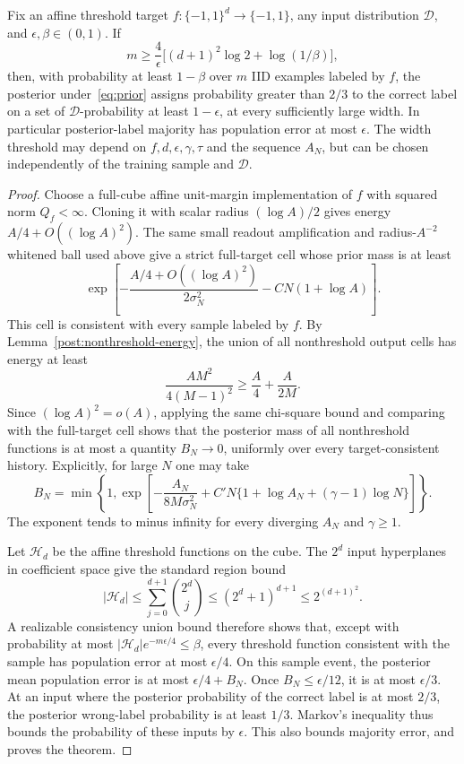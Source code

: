 \begin{theorem}
\label{thm:iid}
Fix an affine threshold target $f:\{-1,1\}^d\to\{-1,1\}$,
any input distribution $\mathcal D$, and $\epsilon,\beta\in(0,1)$.
If
\[
 m\ge\frac4\epsilon\bigl[(d+1)^2\log2+\log(1/\beta)\bigr],
\]
then, with probability at least $1-\beta$ over $m$ IID examples labeled
by $f$, the posterior under~\eqref{eq:prior} assigns probability greater
than $2/3$ to the correct label on a set of $\mathcal D$-probability at
least $1-\epsilon$, at every sufficiently large width.
In particular posterior-label majority has population error at most
$\epsilon$. The width threshold may depend on $f,d,\epsilon,\gamma,\tau$
and the sequence $A_N$, but can be chosen independently of the training
sample and $\mathcal D$.
\end{theorem}
\begin{proof}
Choose a full-cube affine unit-margin implementation of $f$ with squared
norm $Q_f<\infty$. Cloning it with scalar radius $(\log A)/2$ gives
energy $A/4+O((\log A)^2)$. The same small readout amplification and
radius-$A^{-2}$ whitened ball used above give a strict full-target cell
whose prior mass is at least
\[
 \exp\left[-\frac{A/4+O((\log A)^2)}{2\sigma_N^2}
            -C N(1+\log A)\right].
\]
This cell is consistent with every sample labeled by $f$.
By Lemma~\ref{post:nonthreshold-energy}, the union of all nonthreshold
output cells has energy at least
\[
 \frac{AM^2}{4(M-1)^2}\ge\frac A4+\frac A{2M}.
\]
Since $(\log A)^2=o(A)$, applying the same chi-square bound and comparing
with the full-target cell shows that the posterior mass of all
nonthreshold functions is at most a quantity $B_N\to0$, uniformly over
every target-consistent history. Explicitly, for large $N$ one may take
\[
 B_N=\min\left\{1,
 \exp\left[-\frac{A_N}{8M\sigma_N^2}
       +C' N\{1+\log A_N+(\gamma-1)\log N\}\right]\right\}.
\]
The exponent tends to minus infinity for every diverging $A_N$ and
$\gamma\ge1$.

Let $\mathcal H_d$ be the affine threshold functions on the cube.
The $2^d$ input hyperplanes in coefficient space give the standard region
bound
\[
 |\mathcal H_d|\le\sum_{j=0}^{d+1}\binom{2^d}{j}
 \le(2^d+1)^{d+1}\le2^{(d+1)^2}.
\]
A realizable consistency union bound therefore shows that, except with
probability at most $|\mathcal H_d|e^{-m\epsilon/4}\le\beta$, every
threshold function consistent with the sample has population error at
most $\epsilon/4$.
On this sample event, the posterior mean population error is at most
$\epsilon/4+B_N$. Once $B_N\le\epsilon/12$, it is at most $\epsilon/3$.
At an input where the posterior probability of the correct label is at
most $2/3$, the posterior wrong-label probability is at least $1/3$.
Markov's inequality thus bounds the probability of these inputs by
$\epsilon$. This also bounds majority error, and proves the theorem.
\end{proof}
